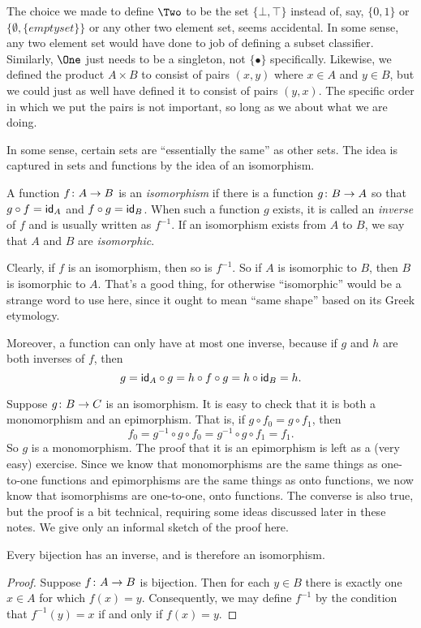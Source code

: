 The choice we made to define $\Two$ to be the set $\{\bot,\top\}$ instead of, say,
$\{0,1\}$ or $\{\emptyset, \{emptyset\}\}$ or any other two element set, seems accidental. In some sense, any two element set would have done to job of defining a subset classifier. Similarly, $\One$ just needs to be a singleton, not $\{\bullet\}$ specifically. Likewise, we defined the product $A\times B$ 
to consist of pairs $(x,y)$ where $x\in A$ and $y\in B$, but we could just as well have defined it to consist of pairs $(y,x)$. The specific order in which we put the pairs is not important, so long as we about what we are doing.

In some sense, certain sets are ``essentially the same'' as other sets. The idea is captured in sets and functions by the idea of an isomorphism.

\begin{defn}
	A function ${f}\colon{A}\to{B}$ is an \emph{isomorphism} if there is a function
	${g}\colon{B}\to{A}$ so that $g\circ f = \textsf{id}_A$ and $f\circ g= \textsf{id}_B$. 
	When such a function $g$ exists, it is called an \emph{inverse} of $f$ and is usually written as $f^{-1}$. 
	If an isomorphism exists from $A$ to $B$, we say that $A$ and $B$ are \emph{isomorphic}.
\end{defn}

Clearly, if $f$ is an isomorphism, then so is $f^{-1}$. 
So if $A$ is isomorphic to $B$, then $B$ is isomorphic to $A$. 
That's a good thing, for otherwise ``isomorphic'' would be a strange word to use here, since it ought to mean ``same shape'' based on its Greek etymology. 

Moreover, a function  can only have at most one inverse, because if $g$ and $h$ are both inverses of $f$,
then \[g = \textsf{id}_A\circ g = h\circ f\circ g = h\circ \textsf{id}_B = h.\]

Suppose ${g}\colon{B}\to{C}$ is an isomorphism.
It is easy to check that it is both a monomorphism and an epimorphism. 
That is, if $g\circ f_0 = g\circ f_1$, then \[f_0 = g^{-1}\circ g\circ f_0 = g^{-1}\circ g\circ f_1 = f_1.\] 
So $g$ is a monomorphism.
The proof that it is an epimorphism is left as a (very easy) exercise. 
Since we know that monomorphisms are the same things as one-to-one functions and epimorphisms are the same things as onto functions, we now know that isomorphisms are one-to-one, onto functions.
The converse is also true, but the proof is a bit technical, requiring some ideas discussed later in these notes.
We give only an informal sketch of the proof here.

\begin{lemma}
	Every bijection has an inverse, and is therefore an isomorphism.
	
	\begin{proof}
		Suppose ${f}\colon{A}\to{B}$ is bijection. Then for each $y\in B$ there is exactly one $x\in A$ for which $f(x)=y$. Consequently, we may define $f^{-1}$ by the condition that $f^{-1}(y)=x$ if and only if $f(x)=y$. 
	\end{proof}
\end{lemma}

